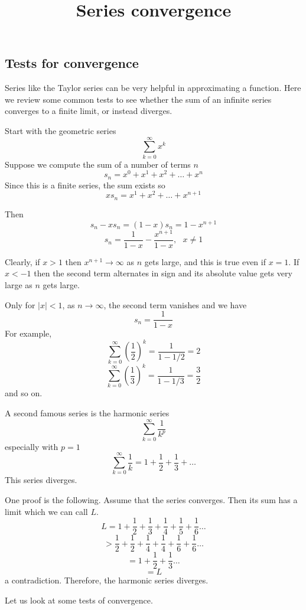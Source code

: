 \documentclass[11pt, oneside]{article}
\title{Series convergence}
\date{}
\begin{document}
\maketitle
\Large


\subsection*{Tests for convergence}
Series like the Taylor series can be very helpful in approximating a function.  Here we review some common tests to see whether the sum of an infinite series converges to a finite limit, or instead diverges.

Start with the geometric series
\[ \sum_{k=0}^{\infty} x^k \]
Suppose we compute the sum of a number of terms $n$
\[ s_n = x^0 + x^1 + x^2 + \dots + x^n \]
Since this is a finite series, the sum exists so
\[ x s_n = x^1 + x^2 + \dots + x^{n+1} \]

Then
\[ s_n - x s_n = (1-x) s_n = 1 - x^{n+1} \]
\[ s_n = \frac{1}{1-x} - \frac{x^{n+1}}{1-x}, \ \ \ x \ne 1 \]

Clearly, if $x>1$ then $x^{n+1} \rightarrow \infty$ as $n$ gets large, and this is true even if $x = 1$.  If $x<-1$ then the second term alternates in sign and its absolute value gets very large as $n$ gets large.  

Only for $|x| < 1$, as $n \rightarrow \infty$, the second term vanishes and we have
\[ s_n = \frac{1}{1-x} \]
For example,
\[ \sum_{k=0}^{\infty} (\frac{1}{2})^k = \frac{1}{1-1/2} = 2 \]
\[ \sum_{k=0}^{\infty} (\frac{1}{3})^k = \frac{1}{1-1/3} = \frac{3}{2} \]
and so on.

A second famous series is the harmonic series
\[ \sum_{k=0}^{\infty} \frac{1}{k^p} \]
especially with $p=1$
\[ \sum_{k=0}^{\infty} \frac{1}{k} = 1 + \frac{1}{2} + \frac{1}{3} + \dots \]
This series diverges.  

One proof is the following.  Assume that the series converges.  Then its sum has a limit which we can call $L$.
\[ L = 1 + \frac{1}{2} + \frac{1}{3} + \frac{1}{4} +  \frac{1}{5} +  \frac{1}{6} \dots \]
\[ > \frac{1}{2} + \frac{1}{2} + \frac{1}{4} + \frac{1}{4} +  \frac{1}{6} +  \frac{1}{6}  \dots \]
\[ = 1 + \frac{1}{2} + \frac{1}{3} \dots \]
\[ = L \]
a contradiction.  Therefore, the harmonic series diverges.

Let us look at some tests of convergence.
\end{document}
